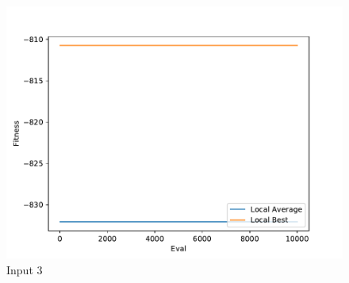 \documentclass{standalone}
\begin{document}
\begin{figure}[!htb]
	\caption{Input 3}
	\label{fig:graph_3050}
	\includegraphics[width=\textwidth]{../graphs/graphs/3050.pdf}
\end{figure}
\end{document}
